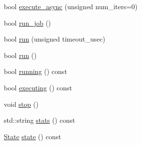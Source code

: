 \begin{DoxyCompactItemize}
\item 
bool \hyperlink{classecto_1_1scheduler_a2e9982c19e57c9e578d2f8f54c24dc1a}{execute\-\_\-async} (unsigned num\-\_\-iters=0)
\item 
bool \hyperlink{classecto_1_1scheduler_a7fcfe7583c13ff5d2294242aedfa0b1a}{run\-\_\-job} ()
\item 
bool \hyperlink{classecto_1_1scheduler_a326022cba6c3154f28f9694b7c9968fd}{run} (unsigned timeout\-\_\-usec)
\item 
bool \hyperlink{classecto_1_1scheduler_a8d5ce4f97e511341f315bb7621ba38f4}{run} ()
\item 
bool \hyperlink{classecto_1_1scheduler_a99ac4b8df3d015f6a39d0cf7607cc657}{running} () const 
\item 
bool \hyperlink{classecto_1_1scheduler_a13257817e1cc6c1ce04ef0bfdabc5375}{executing} () const 
\item 
void \hyperlink{classecto_1_1scheduler_ab974783264da5c33a19110926b5565f4}{stop} ()
\item 
std\-::string \hyperlink{classecto_1_1scheduler_a99d2f51779f856b3905bb8b493f091c4}{stats} () const 
\item 
\hyperlink{classecto_1_1scheduler_a6b063d1c4bb9dad58d7ace61946b1200}{State} \hyperlink{classecto_1_1scheduler_abe971e8b6f6c77ab35c862c723b6d5e9}{state} () const 
\end{DoxyCompactItemize}
